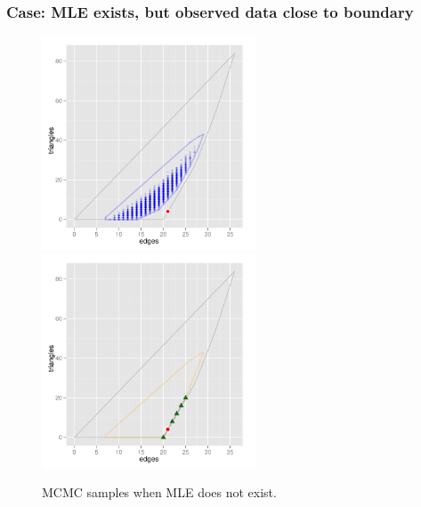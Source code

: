 \documentclass[slidestop,compress, 10pt]{beamer}
\begin{document}
{
\frametitle{Case: MLE exists, but observed data close to boundary}  
\begin{figure}[h]
\centering
\includegraphics[height=2.5in]{MCsample-problem}
\includegraphics[height=2.5in]{MCsample-fakeface}
\caption{MCMC samples when MLE does not exist.}
\label{F:MCsample-MLE problem}
\end{figure}
}
\setcounter{framenumber}{\value{finalframe}}
\end{document}

